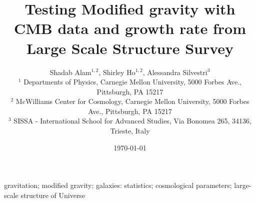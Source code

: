 \documentclass[useAMS,usenatbib]{mn2e}
\begin{document}

\title[LSS $f\sigma_8+CMB$]{Testing Modified gravity with CMB data and growth rate from Large Scale Structure Survey}
\author[Alam et al.] {
    Shadab Alam$^{1,2}$, Shirley Ho$^{1,2}$,  
    Alessandra Silvestri$^{3}$  \\
    $^{1}$ Departments of Physics, Carnegie Mellon University, 5000 Forbes Ave., Pittsburgh, PA 15217 \\
    $^{2}$ McWilliams Center for Cosmology, Carnegie Mellon University, 5000 Forbes Ave., Pittsburgh, PA 15217 \\
    $^{3}$ SISSA - International School for Advanced Studies, Via Bonomea 265, 34136, Trieste, Italy }
    
\date{\today}
\pagerange{\pageref{firstpage}--\pageref{lastpage}}   
\maketitle
\label{firstpage}





\begin{keywords}
    gravitation; modified gravity;
    galaxies: statistics;
    cosmological parameters;
    large-scale structure of Universe
\end{keywords}




















%
%

\label{lastpage}
\end{document}
